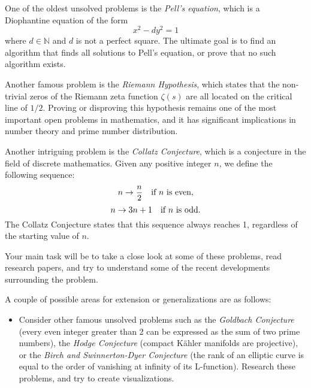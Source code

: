 \documentclass{article}
\begin{document}
    \vspace{3mm}
    One of the oldest unsolved problems is the \textit{Pell's equation}, which is a Diophantine equation of the form $$x^2 - dy^2 = 1$$ where $d \in \mathbb{N}$ and $d$ is not a perfect square. The ultimate goal is to find an algorithm that finds all solutions to Pell's equation, or prove that no such algorithm exists.
    
    \vspace{3mm}
    Another famous problem is the \textit{Riemann Hypothesis}, which states that the non-trivial zeros of the Riemann zeta function $\zeta(s)$ are all located on the critical line of $1/2$. Proving or disproving this hypothesis remains one of the most important open problems in mathematics, and it has significant implications in number theory and prime number distribution. 
    
    \vspace{3mm}
    Another intriguing problem is the \textit{Collatz Conjecture}, which is a conjecture in the field of discrete mathematics. Given any positive integer $n$, we define the following sequence: $$n \rightarrow \frac{n}{2} \text{\quad if $n$ is even},$$ $$n \rightarrow 3n + 1 \text{\quad if $n$ is odd}.$$ The Collatz Conjecture states that this sequence always reaches 1, regardless of the starting value of $n$.
    
    \vspace{3mm}
    Your main task will be to take a close look at some of these problems, read research papers, and try to understand some of the recent developments surrounding the problem.
    
    \vspace{3mm}
    A couple of possible areas for extension or generalizations are as follows:
    \begin{itemize}
        \item Consider other famous unsolved problems such as the \textit{Goldbach Conjecture} (every even integer greater than 2 can be expressed as the sum of two prime numbers), the \textit{Hodge Conjecture} (compact K\"ahler manifolds are projective), or the \textit{Birch and Swinnerton-Dyer Conjecture} (the rank of an elliptic curve is equal to the order of vanishing at infinity of its L-function). Research these problems, and try to create visualizations.
    \end{itemize}
\end{document}
